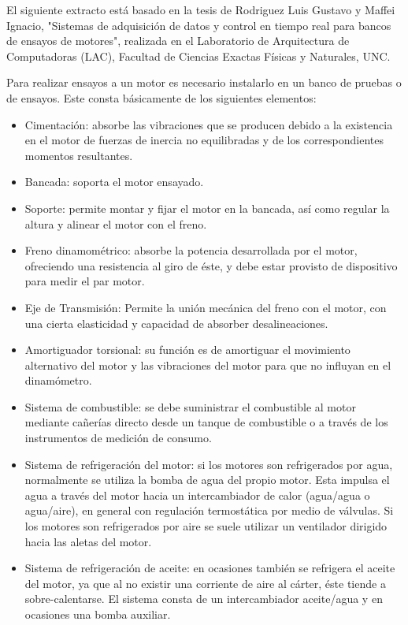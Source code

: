 El siguiente extracto está basado en la tesis de Rodriguez Luis Gustavo y Maffei Ignacio, "Sistemas de adquisición de datos y control en tiempo real para bancos de ensayos de motores", realizada en el Laboratorio de Arquitectura de Computadoras (LAC), Facultad de Ciencias Exactas Físicas y Naturales, UNC.

Para realizar ensayos a un motor es necesario instalarlo en un banco de pruebas o de ensayos. Este consta básicamente de los siguientes elementos:

\begin{itemize}
\item Cimentación: absorbe las vibraciones que se producen debido a la existencia en el motor de fuerzas de inercia no equilibradas y de los correspondientes momentos resultantes.
\item Bancada: soporta el motor ensayado.
\item Soporte: permite montar y fijar el motor en la bancada, así como regular la altura y alinear el motor con el freno.
\item Freno dinamométrico: absorbe la potencia desarrollada por el motor, ofreciendo una resistencia al giro de éste, y debe estar provisto de dispositivo para medir el par motor.
\item Eje de Transmisión: Permite la unión mecánica del freno con el motor, con una cierta elasticidad y capacidad de absorber desalineaciones.
\item Amortiguador torsional: su función es de amortiguar el movimiento alternativo del motor y las vibraciones del motor para que no influyan en el dinamómetro.
\item Sistema de combustible: se debe suministrar el combustible al motor mediante cañerías directo desde un tanque de combustible o a través de los instrumentos de medición de consumo.
\item Sistema de refrigeración del motor: si los motores son refrigerados por agua, normalmente se utiliza la bomba de agua del propio motor. Esta impulsa el agua a través del motor hacia un intercambiador de calor (agua/agua o agua/aire), en general con regulación termostática por medio de válvulas.
Si los motores son refrigerados por aire se suele utilizar un ventilador dirigido hacia las aletas del motor.
\item Sistema de refrigeración de aceite: en ocasiones también se refrigera el aceite del motor, ya que al no existir una corriente de aire al cárter, éste tiende a sobre-calentarse. El sistema consta de un intercambiador aceite/agua y en ocasiones una bomba auxiliar.

\end{itemize}

